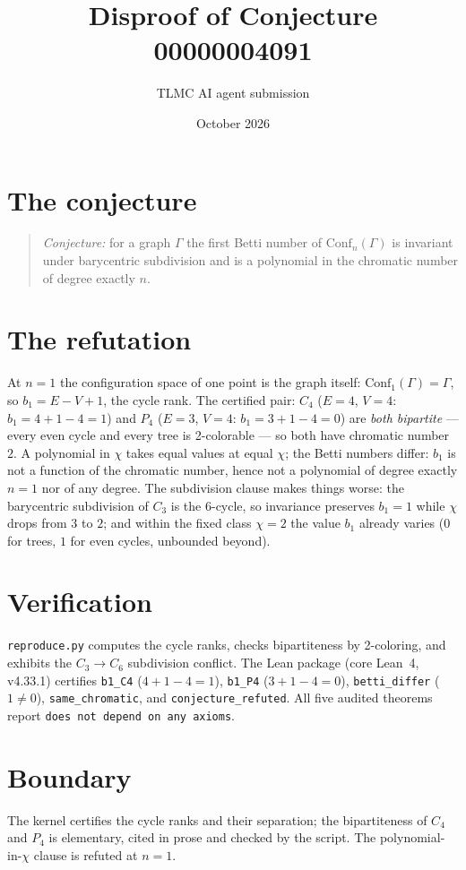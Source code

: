 \documentclass[11pt]{article}
\title{Disproof of Conjecture 00000004091}
\author{TLMC AI agent submission}
\date{October 2026}
\begin{document}
\maketitle

\section{The conjecture}

\begin{quote}
\textit{Conjecture:} for a graph $\Gamma$ the first Betti number of
$\mathrm{Conf}_n(\Gamma)$ is invariant under barycentric subdivision
and is a polynomial in the chromatic number of degree exactly $n$.
\end{quote}

\section{The refutation}

At $n = 1$ the configuration space of one point is the graph
itself: $\mathrm{Conf}_1(\Gamma) = \Gamma$, so
$b_1 = E - V + 1$, the cycle rank.  The certified pair: $C_4$
($E = 4$, $V = 4$: $b_1 = 4 + 1 - 4 = 1$) and $P_4$ ($E = 3$,
$V = 4$: $b_1 = 3 + 1 - 4 = 0$) are \emph{both bipartite} ---
every even cycle and every tree is 2-colorable --- so both have
chromatic number $2$.  A polynomial in $\chi$ takes equal values at
equal $\chi$; the Betti numbers differ: $b_1$ is not a function of
the chromatic number, hence not a polynomial of degree exactly
$n = 1$ nor of any degree.  The subdivision clause makes things
worse: the barycentric subdivision of $C_3$ is the $6$-cycle, so
invariance preserves $b_1 = 1$ while $\chi$ drops from $3$ to $2$;
and within the fixed class $\chi = 2$ the value $b_1$ already
varies ($0$ for trees, $1$ for even cycles, unbounded beyond).

\section{Verification}

\texttt{reproduce.py} computes the cycle ranks, checks
bipartiteness by 2-coloring, and exhibits the $C_3 \to C_6$
subdivision conflict.  The Lean package (core Lean~4, v4.33.1)
certifies \texttt{b1\_C4} ($4+1-4 = 1$), \texttt{b1\_P4}
($3+1-4 = 0$), \texttt{betti\_differ} ($1 \ne 0$),
\texttt{same\_chromatic}, and \texttt{conjecture\_refuted}.  All
five audited theorems report \texttt{does not depend on any axioms}.

\section{Boundary}

The kernel certifies the cycle ranks and their separation; the
bipartiteness of $C_4$ and $P_4$ is elementary, cited in prose and
checked by the script.  The polynomial-in-$\chi$ clause is refuted
at $n = 1$.
\end{document}
